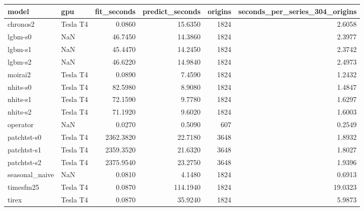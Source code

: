 \begin{tabular}{llrrrr}
\toprule
model & gpu & fit_seconds & predict_seconds & origins & seconds_per_series_304_origins \\
\midrule
chronos2 & Tesla T4 & 0.0860 & 15.6350 & 1824 & 2.6058 \\
lgbm-s0 & NaN & 46.7450 & 14.3860 & 1824 & 2.3977 \\
lgbm-s1 & NaN & 45.4470 & 14.2450 & 1824 & 2.3742 \\
lgbm-s2 & NaN & 46.6220 & 14.9840 & 1824 & 2.4973 \\
moirai2 & Tesla T4 & 0.0890 & 7.4590 & 1824 & 1.2432 \\
nhits-s0 & Tesla T4 & 82.5980 & 8.9080 & 1824 & 1.4847 \\
nhits-s1 & Tesla T4 & 72.1590 & 9.7780 & 1824 & 1.6297 \\
nhits-s2 & Tesla T4 & 71.1920 & 9.6020 & 1824 & 1.6003 \\
operator & NaN & 0.0270 & 0.5090 & 607 & 0.2549 \\
patchtst-s0 & Tesla T4 & 2362.3820 & 22.7180 & 3648 & 1.8932 \\
patchtst-s1 & Tesla T4 & 2359.3520 & 21.6320 & 3648 & 1.8027 \\
patchtst-s2 & Tesla T4 & 2375.9540 & 23.2750 & 3648 & 1.9396 \\
seasonal_naive & NaN & 0.0810 & 4.1480 & 1824 & 0.6913 \\
timesfm25 & Tesla T4 & 0.0870 & 114.1940 & 1824 & 19.0323 \\
tirex & Tesla T4 & 0.0870 & 35.9240 & 1824 & 5.9873 \\
\bottomrule
\end{tabular}

